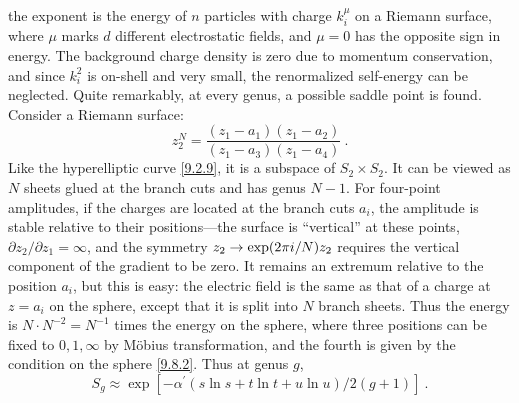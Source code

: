 the exponent is the energy of $n$ particles with charge $k_{i}^{\mu}$ on a Riemann surface, where $\mu$ marks $d$ different electrostatic fields, and $\mu=0$ has the opposite sign in energy. 
The background charge density is zero due to momentum conservation, and since $k_{i}^{2}$ is on-shell and very small, the renormalized self-energy can be neglected.
Quite remarkably, at every genus, a possible saddle point is found. Consider a Riemann surface:
\begin{equation}
	z_{2}^{N} = \frac{(z_{1}-a_{1})(z_{1}-a_{2})}{(z_{1}-a_{3})(z_{1}-a_{4})} \:. \label{9.8.6}
\end{equation}
Like the hyperelliptic curve \eqref{9.2.9}, it is a subspace of $S_{2} \times S_{2}$. It can be viewed as $N$ sheets glued at the branch cuts and has genus $N{-}1$.
For four-point amplitudes, if the charges are located at the branch cuts $a_{i}$, the amplitude is stable relative to their positions—the surface is ``vertical'' at these points, $\partial z_{2} / \partial z_{1}=\infty$, 
and the symmetry $z_{2} \to \exp (2 \pi i / N) z_{2}$ requires the vertical component of the gradient to be zero.
It remains an extremum relative to the position $a_{i}$, but this is easy: 
the electric field is the same as that of a charge at $z=a_{i}$ on the sphere, except that it is split into $N$ branch sheets. Thus the energy is $N \cdot N^{-2}=N^{-1}$ times the energy on the sphere, 
where three positions can be fixed to $0,1,\infty$ by Möbius transformation, and the fourth is given by the condition on the sphere \eqref{9.8.2}.
Thus at genus $g$,
\begin{equation}
	S_{g} \approx \exp [-\alpha^{\prime}(s \ln s + t \ln t + u \ln u) / 2(g+1)] \:.
	\label{9.8.7}
\end{equation}
